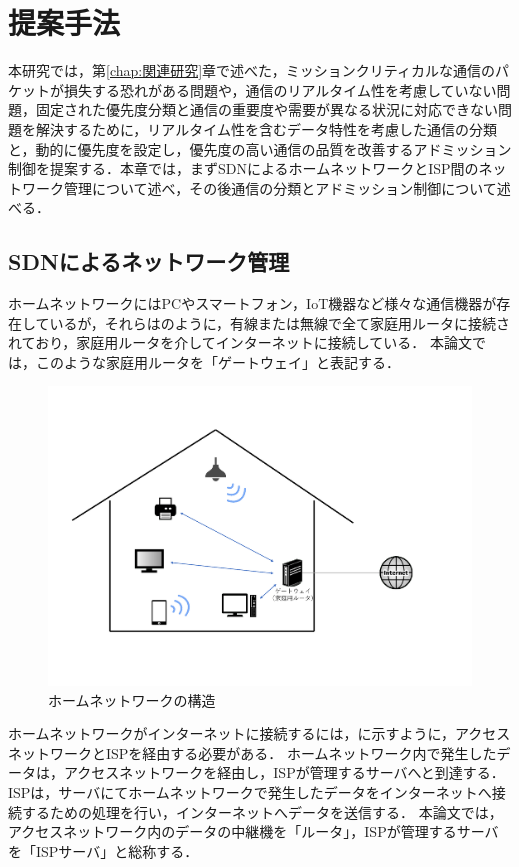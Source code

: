 \documentclass[a4paper,11pt,uplatex]{ujreport}
\begin{document}
\chapter{提案手法}
\label{chap:提案手法}

  本研究では，第\ref{chap:関連研究}章で述べた，ミッションクリティカルな通信のパケットが損失する恐れがある問題や，通信のリアルタイム性を考慮していない問題，固定された優先度分類と通信の重要度や需要が異なる状況に対応できない問題を解決するために，リアルタイム性を含むデータ特性を考慮した通信の分類と，動的に優先度を設定し，優先度の高い通信の品質を改善するアドミッション制御を提案する．本章では，まずSDNによるホームネットワークとISP間のネットワーク管理について述べ，その後通信の分類とアドミッション制御について述べる．

\section{SDNによるネットワーク管理}
\label{sec:SDNによるネットワーク管理}

  ホームネットワークにはPCやスマートフォン，IoT機器など様々な通信機器が存在しているが，それらはのように，有線または無線で全て家庭用ルータに接続されており，家庭用ルータを介してインターネットに接続している．
  本論文では，このような家庭用ルータを「ゲートウェイ」と表記する．

  \begin{figure}[tb]
    \centering
    \includegraphics[width=0.9\linewidth]{img/homenetwork_trimmed.pdf}
    \caption{ホームネットワークの構造}
    \label{fig:homenetwork}
  \end{figure}

  ホームネットワークがインターネットに接続するには，に示すように，アクセスネットワークとISPを経由する必要がある．
  ホームネットワーク内で発生したデータは，アクセスネットワークを経由し，ISPが管理するサーバへと到達する．
  ISPは，サーバにてホームネットワークで発生したデータをインターネットへ接続するための処理を行い，インターネットへデータを送信する．
  本論文では，アクセスネットワーク内のデータの中継機を「ルータ」，ISPが管理するサーバを「ISPサーバ」と総称する．\par
\end{document}
